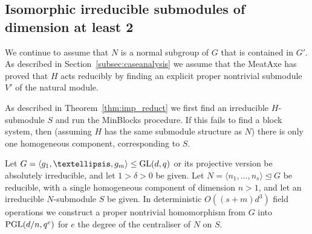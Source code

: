 \subsection{Isomorphic irreducible submodules of dimension at least 2} 
\label{subsec:tensor}

We continue to assume that $N$ is a normal subgroup of $G$ that is
contained in $G'$. As described in
Section~\ref{subsec:caseanalysis} we assume that the
MeatAxe has proved that $H$ acts reducibly by finding an explicit
proper nontrivial submodule $V'$ of the natural module.

As described in Theorem~\ref{thm:imp_reduct} we first find an
irreducible $H$-submodule $S$ and run the {\sc MinBlocks} procedure. If
this fails to find a block system, then (assuming $H$ has the same
submodule structure as $N$) there is only one homogeneous component,
corresponding to $S$.

\begin{Theo} 
Let  $G = \langle g_1, \ldots, g_m \rangle \leq \GL(d, q)$ or its
projective version be absolutely irreducible, and let $1 > \delta > 0$ be given.
Let $N = \langle n_1, \ldots, n_s \rangle  \unlhd G$ be reducible, with a single homogeneous component of dimension $n > 1$, and let an irreducible $N$-submodule $S$ be given.
In deterministic $O((s+m)d^3)$ field operations we construct a proper nontrivial 
homomorphism from $G$ into\/ $\PGL(d/n, q^e)$ for $e$ the degree of 
the centraliser of $N$ on $S$. 
\end{Theo}

